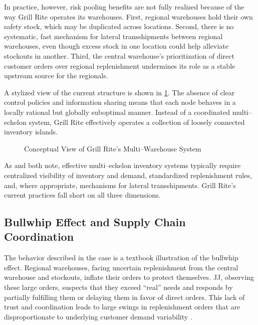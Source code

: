 \documentclass[12pt,a4paper]{article}
\begin{document}
In practice, however, risk pooling benefits are not fully realized because of the way Grill Rite operates its warehouses. First, regional warehouses hold their own safety stock, which may be duplicated across locations. Second, there is no systematic, fast mechanism for lateral transshipments between regional warehouses, even though excess stock in one location could help alleviate stockouts in another. Third, the central warehouse's prioritization of direct customer orders over regional replenishment undermines its role as a stable upstream source for the regionals.

A stylized view of the current structure is shown in \cref{fig:system_structure}. The absence of clear control policies and information sharing means that each node behaves in a locally rational but globally suboptimal manner. Instead of a coordinated multi–echelon system, Grill Rite effectively operates a collection of loosely connected inventory islands.

\begin{figure}[H]
  \centering
  \caption{Conceptual View of Grill Rite's Multi–Warehouse System}
  \label{fig:system_structure}
\end{figure}

As \citet{stevenson2017operations} and \citet{cachon2018matching} both note, effective multi–echelon inventory systems typically require centralized visibility of inventory and demand, standardized replenishment rules, and, where appropriate, mechanisms for lateral transshipments. Grill Rite's current practices fall short on all three dimensions.

\subsection{Bullwhip Effect and Supply Chain Coordination}

The behavior described in the case is a textbook illustration of the bullwhip effect. Regional warehouses, facing uncertain replenishment from the central warehouse and stockouts, inflate their orders to protect themselves. JJ, observing these large orders, suspects that they exceed ``real'' needs and responds by partially fulfilling them or delaying them in favor of direct orders. This lack of trust and coordination leads to large swings in replenishment orders that are disproportionate to underlying customer demand variability  \citep{lee1997bullwhip,cachon2018matching}.
\end{document}
